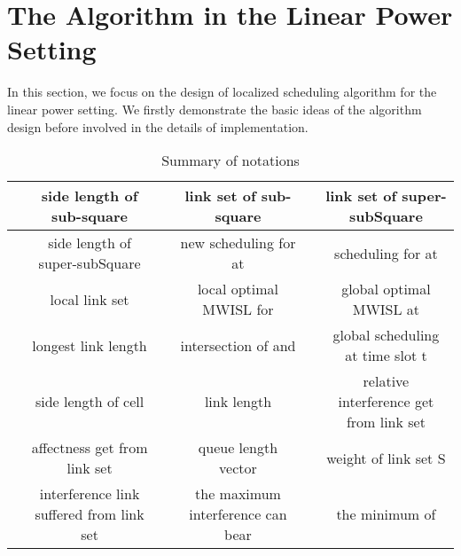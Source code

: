 \documentclass[journal]{IEEEtran}
\begin{document}
\section{The Algorithm in the Linear Power Setting}

In this section, we focus on the design of localized scheduling algorithm for the linear power setting. We firstly demonstrate the basic ideas of the algorithm design before involved in the details of implementation.
\vspace*{-1\baselineskip}


\begin{table*}[t]\setlength{\tabcolsep}{3pt}
\begin{center}
\caption{Summary of notations}
\label{notations}
\begin{tabular}{c|c|c|c|c|c}
  \hline
 & side length of sub-square &  & link set of sub-square &  & link set of super-subSquare\\
    \hline
  & side length of super-subSquare &  & new scheduling for  at  &  & scheduling for  at \\
  \hline
  & local link set   &  & local optimal MWISL for  &  & global optimal MWISL at \\
 \hline
  & longest link length   &  & intersection of  and 
 &  & global scheduling at time slot t\\

\hline
   & side length of cell &  & link length &  & relative interference  get from link set \\
  \hline
   & affectness  get from link set  &  & queue length vector & &weight of link set S \\
  \hline
   & interference  link  suffered from link set  &
   & the maximum interference  can bear &  & the minimum of \\

  \hline
\end{tabular}
\end{center}\vspace{-10pt}
\end{table*}
\end{document}
